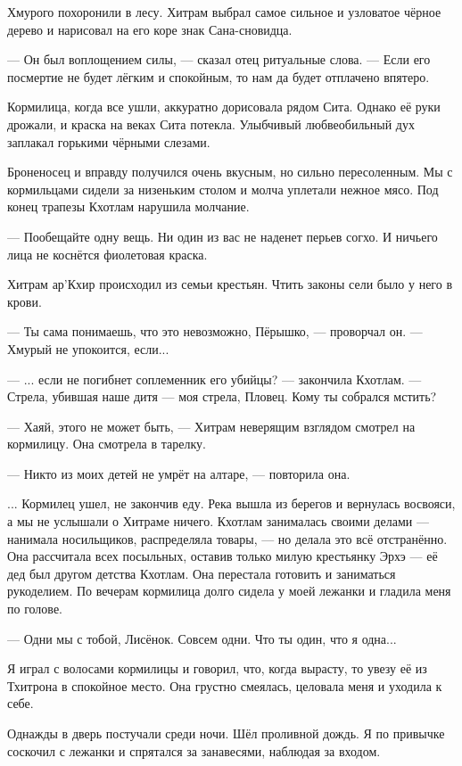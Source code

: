 Хмурого похоронили в лесу.
Хитрам выбрал самое сильное и узловатое чёрное дерево и нарисовал на его коре знак Сана-сновидца.

--- Он был воплощением силы, --- сказал отец ритуальные слова.
--- Если его посмертие не будет лёгким и спокойным, то нам да будет отплачено впятеро.

Кормилица, когда все ушли, аккуратно дорисовала рядом Сита.
Однако её руки дрожали, и краска на веках Сита потекла.
Улыбчивый любвеобильный дух заплакал горькими чёрными слезами.

Броненосец и вправду получился очень вкусным, но сильно пересоленным.
Мы с кормильцами сидели за низеньким столом и молча уплетали нежное мясо.
Под конец трапезы Кхотлам нарушила молчание.

--- Пообещайте одну вещь.
Ни один из вас не наденет перьев согхо.
И ничьего лица не коснётся фиолетовая краска.

Хитрам ар’Кхир происходил из семьи крестьян.
Чтить законы сели было у него в крови.

--- Ты сама понимаешь, что это невозможно, Пёрышко, --- проворчал он.
--- Хмурый не упокоится, если...

--- ... если не погибнет соплеменник его убийцы? --- закончила Кхотлам.
--- Стрела, убившая наше дитя --- моя стрела, Пловец.
Кому ты собрался мстить?

--- Хаяй, этого не может быть, --- Хитрам неверящим взглядом смотрел на кормилицу.
Она смотрела в тарелку.

--- Никто из моих детей не умрёт на алтаре, --- повторила она.

... Кормилец ушел, не закончив еду.
Река вышла из берегов и вернулась восвояси, а мы не услышали о Хитраме ничего.
Кхотлам занималась своими делами --- нанимала носильщиков, распределяла товары, --- но делала это всё отстранённо.
Она рассчитала всех посыльных, оставив только милую крестьянку Эрхэ --- её дед был другом детства Кхотлам.
Она перестала готовить и заниматься рукоделием.
По вечерам кормилица долго сидела у моей лежанки и гладила меня по голове.

--- Одни мы с тобой, Лисёнок.
Совсем одни.
Что ты один, что я одна...

Я играл с волосами кормилицы и говорил, что, когда вырасту, то увезу её из Тхитрона в спокойное место.
Она грустно смеялась, целовала меня и уходила к себе.

Однажды в дверь постучали среди ночи.
Шёл проливной дождь.
Я по привычке соскочил с лежанки и спрятался за занавесями, наблюдая за входом.


